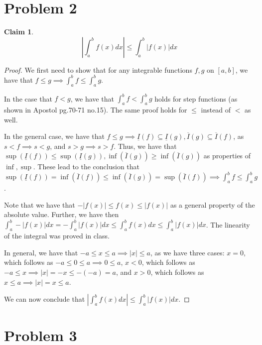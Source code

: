 \documentclass[12pt,letterpaper]{article}
\theoremstyle{definition}
\newtheorem*{claim}{Claim}
\begin{document}
\section*{Problem 2}

\begin{claim}
  $$ \left| \int_a^b f(x)dx \right| \leq \int_a^b|f(x)|dx$$
\end{claim}

\begin{proof}
  We first need to show that for any integrable functions $f,g$ on $[a,b]$, we
  have that $f \leq g \implies \int_a^b f \leq \int_a^b g$.

  In the case that $f < g$, we have that $\int_a^b f < \int_a^b g$ holds for
  step functions (as shown in Apostol pg.70-71 no.15). The same proof holds for
  $\leq$ instead of $<$ as well.

  In the general case, we have that $f \leq g \implies \underline{I}(f)
  \subseteq \underline{I}(g), \overline{I}(g) \subseteq \overline{I}(f)$, as $s
  < f \implies s < g$, and $s > g \implies s > f$. Thus, we have that
  $\sup(\underline{I}(f)) \leq \sup(\underline{I}(g)), \inf(\overline{I}(g))
  \geq \inf(\overline{I}(g))$ as properties of $\inf, \sup$. These lead to the
  conclusion that $\sup(\underline{I}(f)) = \inf(\overline{I}(f)) \leq
  \inf(\overline{I}(g)) = \sup(\overline{I}(f)) \implies \int_a^bf \leq \int_a^b
  g$.
  
  Note that we have that $-|f(x)| \leq f(x) \leq |f(x)|$ as a general property of the absolute
  value. Further, we have then $\int_a^b -|f(x)|dx = -\int_a^b|f(x)|dx \leq \int_a^bf(x)dx \leq \int_a^b |f(x)|dx$.
  The linearity of the integral was proved in class.

  In general, we have that $-a \leq x \leq a \implies |x| \leq a$, as we have
  three cases: $x = 0$, which follows as $-a \leq 0 \leq a \implies 0 \leq a$,
  $x < 0$, which follows as $-a \leq x \implies |x| = -x \leq -(-a) = a$, and $x
  > 0$, which follows as $x \leq a \implies |x| = x \leq a$. 
  
  We can now conclude that $|\int_a^bf(x)dx| \leq \int_a^b|f(x)|dx$.
\end{proof}

\section*{Problem 3}
\end{document}
